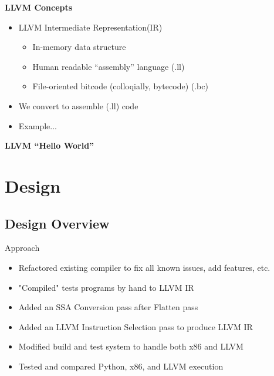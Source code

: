 \documentclass{beamer}
\begin{document}
\begin{frame}{\bf LLVM Concepts}
  \begin{itemize}
  \item<1->LLVM Intermediate Representation(IR)
  \begin{itemize}
  \item<2->In-memory data structure
  \item<3->Human readable ``assembly'' language (.ll)
  \item<4->File-oriented bitcode (colloqially, bytecode) (.bc)
  \end{itemize}
  \item<5->We convert to assemble (.ll) code
  \item<6->Example...
  \end{itemize}
\end{frame}

\begin{frame}{\bf LLVM ``Hello World''}
  
\end{frame}

\section{Design}

\subsection{Design Overview}

\begin{frame}{Approach}
  \begin{itemize}
  \item<1->Refactored existing compiler to fix all known issues, add
    features, etc.
  \item<2->"Compiled" tests programs by hand to LLVM IR
  \item<3->Added an SSA Conversion pass after Flatten pass
  \item<4->Added an LLVM Instruction Selection pass to produce LLVM IR
  \item<5->Modified build and test system to handle both x86 and LLVM
  \item<6->Tested and compared Python, x86, and LLVM execution
  \end{itemize}
\end{frame}
\end{document}
